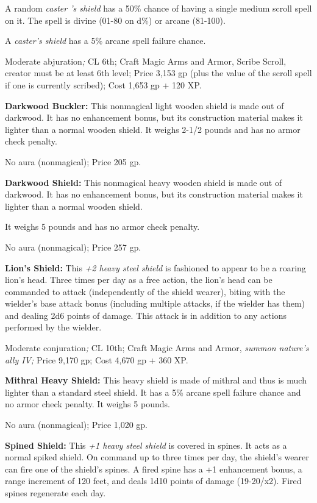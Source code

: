 A random \textit{caster 's shield }has a 50\% chance of having a single medium 
scroll spell on it. The spell is divine (01-80 on d\%) or arcane (81-100).

A \textit{caster's shield }has a 5\% arcane spell failure chance.

Moderate abjuration\textit{; }CL 6th; Craft Magic Arms and Armor, Scribe Scroll, 
creator must be at least 6th level; Price 3,153 gp (plus the value of the scroll 
spell if one is currently scribed); Cost 1,653 gp + 120 XP.

\textbf{Darkwood Buckler: }This nonmagical light wooden shield is made out of darkwood. 
It has no enhancement bonus, but its construction material makes it lighter than 
a normal wooden shield. It weighs 2-1/2 pounds and has no armor check penalty.

No aura (nonmagical); Price 205 gp.

\textbf{Darkwood Shield:} This nonmagical heavy wooden shield is made out of darkwood. 
It has no enhancement bonus, but its construction material makes it lighter than 
a normal wooden shield.

It weighs 5 pounds and has no armor check penalty.

No aura (nonmagical); Price 257 gp.

\textbf{Lion's Shield:} This \textit{+2 heavy steel shield }is fashioned to appear 
to be a roaring lion's head. Three times per day as a free action, the lion's head 
can be commanded to attack (independently of the shield wearer), biting with the 
wielder's base attack bonus (including multiple attacks, if the wielder has them) 
and dealing 2d6 points of damage. This attack is in addition to any actions performed 
by the wielder.

Moderate conjuration\textit{; }CL 10th; Craft Magic Arms and Armor, \textit{summon 
nature's ally IV; }Price 9,170 gp; Cost 4,670 gp + 360 XP.


\textbf{Mithral Heavy Shield:} This heavy shield is made of mithral and thus is 
much lighter than a standard steel shield. It has a 5\% arcane spell failure chance 
and no armor check penalty. It weighs 5 pounds.

No aura (nonmagical); Price 1,020 gp.

\textbf{Spined Shield: }This \textit{+1 heavy steel shield }is covered in spines. 
It acts as a normal spiked shield. On command up to three times per day, the shield's 
wearer can fire one of the shield's spines. A fired spine has a +1 enhancement 
bonus, a range increment of 120 feet, and deals 1d10 points of damage (19-20/x2). 
Fired spines regenerate each day.

